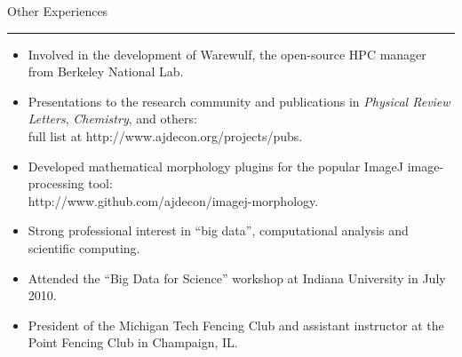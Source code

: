 \documentclass[10pt]{article}
\newcommand{\bigsection}[1]{	
	\vspace{4pt}
	{\fontfamily{phv}\selectfont\Large#1}

	\vspace{-10pt} \rule{\textwidth}{1pt}
}
\begin{document}
%
%
%
%
%
%

\bigsection{Other Experiences}
\begin{itemize}\setlength{\itemsep}{0cm}
  \setlength{\parskip}{0cm}
    \item Involved in the development of Warewulf, the open-source HPC manager from Berkeley National Lab.
    \item Presentations to the research community and publications in \textit{Physical Review Letters}, \textit{Chemistry}, and others: 
    \\ full list at http://www.ajdecon.org/projects/pubs.
    \item Developed mathematical morphology plugins for the popular ImageJ image-processing tool: \\
    http://www.github.com/ajdecon/imagej-morphology.
	\item Strong professional interest in ``big data'', computational analysis and scientific computing.  
    \item Attended the ``Big Data for Science'' workshop at Indiana University in July 2010.
	\item President of the Michigan Tech Fencing Club and assistant instructor at the Point Fencing Club in Champaign, IL.

\end{itemize}
\end{document}
